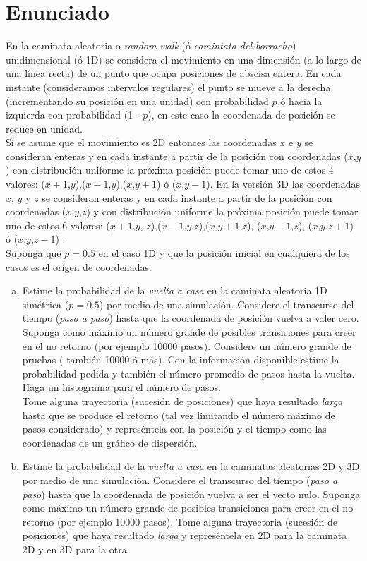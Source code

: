 \documentclass[a4paper,10pt]{article}
\begin{document}
\section*{Enunciado}
En la caminata aleatoria o \textit{random walk} (\'o \textit{camintata del borracho}) unidimensional (\'o 1D) se considera el movimiento en una dimensi\'on 
(a lo largo de una l\'inea recta) de un punto que ocupa posiciones de abscisa entera. En cada instante (consideramos intervalos regulares) el punto se mueve a la derecha  (incrementando
su posici\'on en una unidad) con probabilidad $p$ \'o hacia la izquierda con probabilidad (1 - $p$), en este caso la coordenada de posici\'on se reduce en unidad.
\\ Si se asume que el movimiento es 2D entonces las coordenadas $x$ e $y$ se consideran enteras y en cada instante a partir de la posici\'on con coordenadas ($x$,$y$) con 
distribuci\'on uniforme la pr\'oxima posici\'on puede tomar uno de estos 4 valores: ($x+ 1$,$y$),($x- 1$,$y$),($x$,$y+1$) \'o ($x$,$y-1$). En la versi\'on 3D las coordenadas $x$, $y$ y $z$
se consideran enteras y en cada instante a partir de la posici\'on con coordenadas ($x$,$y$,$z$) y con distribuci\'on uniforme la pr\'oxima posici\'on puede tomar uno de estos 6 valores:
 ($x+ 1$,$y$, $z$),($x- 1$,$y$,$z$),($x$,$y+1$,$z$), ($x$,$y-1$,$z$), ($x$,$y$,$z+1$) \'o ($x$,$y$,$z-1$) .
\\ Suponga que $p = 0.5$ en el caso 1D y que la posici\'on inicial en cualquiera de los casos es el origen de coordenadas.
\\
\begin{enumerate}[a)]
\item Estime la probabilidad de la \textit{vuelta a casa} en la caminata aleatoria 1D sim\'etrica ($p=0.5$) por medio de una simulaci\'on. Considere el transcurso del tiempo 
(\textit{paso a paso}) hasta que la coordenada de posici\'on vuelva a valer cero. Suponga como m\'aximo un n\'umero grande de posibles transiciones para creer en el no retorno (por ejemplo
10000 pasos). Considere un n\'umero grande de pruebas ( tambi\'en 10000 \'o m\'as). Con la informaci\'on disponible estime la probabilidad pedida y tambi\'en el n\'umero promedio de pasos hasta la vuelta. Haga un histograma para el n\'umero de pasos.
\\ Tome alguna trayectoria (sucesi\'on de posiciones) que haya resultado \textit{larga} hasta que se produce el retorno (tal vez limitando el n\'umero m\'aximo de pasos considerado) y 
repres\'entela con la posici\'on y el tiempo como las coordenadas de un gr\'afico de dispersi\'on.
\\
\item  Estime la probabilidad de la \textit{vuelta a casa} en la caminatas aleatorias 2D y 3D por medio de una simulaci\'on. Considere el transcurso del tiempo (\textit{paso a paso}) 
hasta que la coordenada de posici\'on vuelva a ser el vecto nulo. Suponga como m\'aximo un n\'umero grande de posibles transiciones para creer en el no retorno (por ejemplo
10000 pasos). Tome alguna trayectoria (sucesi\'on de posiciones) que haya resultado \textit{larga} y repres\'entela en 2D para la caminata 2D y en 3D para la otra.
\end{enumerate}
\end{document}
